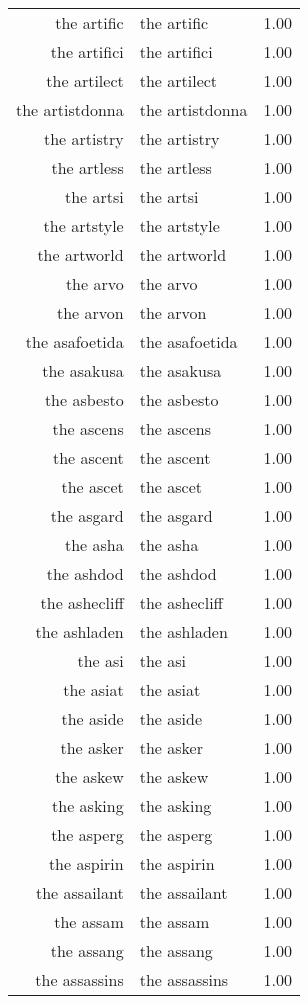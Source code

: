 \begin{table}[ht]
\begin{tabular}{rlr}
  the artific & the artific & 1.00 \\ 
  the artifici & the artifici & 1.00 \\ 
  the artilect & the artilect & 1.00 \\ 
  the artistdonna & the artistdonna & 1.00 \\ 
  the artistry & the artistry & 1.00 \\ 
  the artless & the artless & 1.00 \\ 
  the artsi & the artsi & 1.00 \\ 
  the artstyle & the artstyle & 1.00 \\ 
  the artworld & the artworld & 1.00 \\ 
  the arvo & the arvo & 1.00 \\ 
  the arvon & the arvon & 1.00 \\ 
  the asafoetida & the asafoetida & 1.00 \\ 
  the asakusa & the asakusa & 1.00 \\ 
  the asbesto & the asbesto & 1.00 \\ 
  the ascens & the ascens & 1.00 \\ 
  the ascent & the ascent & 1.00 \\ 
  the ascet & the ascet & 1.00 \\ 
  the asgard & the asgard & 1.00 \\ 
  the asha & the asha & 1.00 \\ 
  the ashdod & the ashdod & 1.00 \\ 
  the ashecliff & the ashecliff & 1.00 \\ 
  the ashladen & the ashladen & 1.00 \\ 
  the asi & the asi & 1.00 \\ 
  the asiat & the asiat & 1.00 \\ 
  the aside & the aside & 1.00 \\ 
  the asker & the asker & 1.00 \\ 
  the askew & the askew & 1.00 \\ 
  the asking & the asking & 1.00 \\ 
  the asperg & the asperg & 1.00 \\ 
  the aspirin & the aspirin & 1.00 \\ 
  the assailant & the assailant & 1.00 \\ 
  the assam & the assam & 1.00 \\ 
  the assang & the assang & 1.00 \\ 
  the assassins & the assassins & 1.00 \\ 

\end{tabular}
\end{table}
